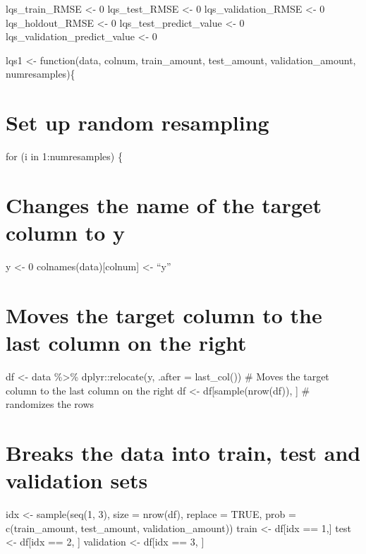 \documentclass[
]{book}
\begin{document}
lqs\_train\_RMSE \textless- 0 lqs\_test\_RMSE \textless- 0 lqs\_validation\_RMSE \textless- 0
lqs\_holdout\_RMSE \textless- 0 lqs\_test\_predict\_value \textless- 0
lqs\_validation\_predict\_value \textless- 0

lqs1 \textless- function(data, colnum, train\_amount, test\_amount,
validation\_amount, numresamples)\{

\chapter{Set up random resampling}\label{set-up-random-resampling-8}

for (i in 1:numresamples) \{

\chapter{Changes the name of the target column to y}\label{changes-the-name-of-the-target-column-to-y-8}

y \textless- 0 colnames(data){[}colnum{]} \textless- ``y''

\chapter{Moves the target column to the last column on the right}\label{moves-the-target-column-to-the-last-column-on-the-right-8}

df \textless- data \%\textgreater\% dplyr::relocate(y, .after = last\_col()) \# Moves the
target column to the last column on the right df \textless-
df{[}sample(nrow(df)), {]} \# randomizes the rows

\chapter{Breaks the data into train, test and validation sets}\label{breaks-the-data-into-train-test-and-validation-sets-8}

idx \textless- sample(seq(1, 3), size = nrow(df), replace = TRUE, prob =
c(train\_amount, test\_amount, validation\_amount)) train \textless- df{[}idx == 1,{]} test \textless- df{[}idx == 2, {]} validation \textless- df{[}idx == 3, {]}
\end{document}
